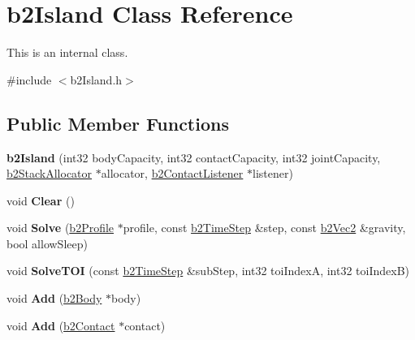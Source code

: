 \hypertarget{classb2_island}{\section{b2\-Island Class Reference}
\label{classb2_island}
}


This is an internal class.  




{\ttfamily \#include $<$b2\-Island.\-h$>$}

\subsection*{Public Member Functions}
\begin{DoxyCompactItemize}
\item 
\hypertarget{classb2_island_a2f2258f09d2663dcb35a1d69d16896cb}{{\bfseries b2\-Island} (int32 body\-Capacity, int32 contact\-Capacity, int32 joint\-Capacity, \hyperlink{classb2_stack_allocator}{b2\-Stack\-Allocator} $\ast$allocator, \hyperlink{classb2_contact_listener}{b2\-Contact\-Listener} $\ast$listener)}\label{classb2_island_a2f2258f09d2663dcb35a1d69d16896cb}

\item 
\hypertarget{classb2_island_a26566f7388fcaf7523446e5e76d99c4d}{void {\bfseries Clear} ()}\label{classb2_island_a26566f7388fcaf7523446e5e76d99c4d}

\item 
\hypertarget{classb2_island_a28a6f74174cde3a6e93663c740f418fa}{void {\bfseries Solve} (\hyperlink{structb2_profile}{b2\-Profile} $\ast$profile, const \hyperlink{structb2_time_step}{b2\-Time\-Step} \&step, const \hyperlink{structb2_vec2}{b2\-Vec2} \&gravity, bool allow\-Sleep)}\label{classb2_island_a28a6f74174cde3a6e93663c740f418fa}

\item 
\hypertarget{classb2_island_a61f577b473962bb0d8add1f55eeef7ee}{void {\bfseries Solve\-T\-O\-I} (const \hyperlink{structb2_time_step}{b2\-Time\-Step} \&sub\-Step, int32 toi\-Index\-A, int32 toi\-Index\-B)}\label{classb2_island_a61f577b473962bb0d8add1f55eeef7ee}

\item 
\hypertarget{classb2_island_af2d54861bd063051c0a6dc5f73b27c3e}{void {\bfseries Add} (\hyperlink{classb2_body}{b2\-Body} $\ast$body)}\label{classb2_island_af2d54861bd063051c0a6dc5f73b27c3e}

\item 
\hypertarget{classb2_island_abc0ea9208e818b551404fd507f197a51}{void {\bfseries Add} (\hyperlink{classb2_contact}{b2\-Contact} $\ast$contact)}\label{classb2_island_abc0ea9208e818b551404fd507f197a51}


\end{DoxyCompactItemize}
